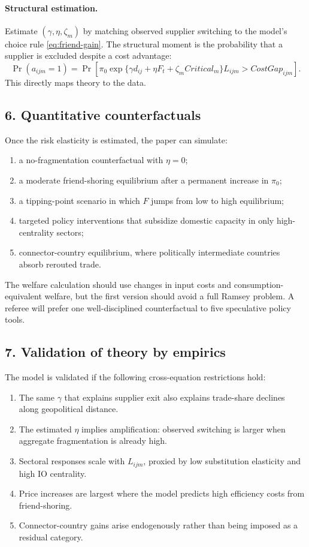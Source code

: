 \documentclass[11pt]{article}
\begin{document}
\paragraph{Structural estimation.} Estimate $(\gamma,\eta,\zeta_m)$ by matching observed supplier switching to the model's choice rule \eqref{eq:friend-gain}. The structural moment is the probability that a supplier is excluded despite a cost advantage:
\begin{equation}
\Pr(a_{ijm}=1)=\Pr\left[\pi_0\exp\{\gamma d_{ij}+\eta F_t+\zeta_m Critical_m\}L_{ijm}>CostGap_{ijm}\right].
\end{equation}
This directly maps theory to the data.

\subsection*{6. Quantitative counterfactuals}
Once the risk elasticity is estimated, the paper can simulate:
\begin{enumerate}[label=(\roman*)]
\item a no-fragmentation counterfactual with $\eta=0$;
\item a moderate friend-shoring equilibrium after a permanent increase in $\pi_0$;
\item a tipping-point scenario in which $F$ jumps from low to high equilibrium;
\item targeted policy interventions that subsidize domestic capacity in only high-centrality sectors;
\item connector-country equilibrium, where politically intermediate countries absorb rerouted trade.
\end{enumerate}
The welfare calculation should use changes in input costs and consumption-equivalent welfare, but the first version should avoid a full Ramsey problem. A referee will prefer one well-disciplined counterfactual to five speculative policy tools.

\subsection*{7. Validation of theory by empirics}
The model is validated if the following cross-equation restrictions hold:
\begin{enumerate}[label=\textbf{V\arabic*.},leftmargin=*]
\item The same $\gamma$ that explains supplier exit also explains trade-share declines along geopolitical distance.
\item The estimated $\eta$ implies amplification: observed switching is larger when aggregate fragmentation is already high.
\item Sectoral responses scale with $L_{ijm}$, proxied by low substitution elasticity and high IO centrality.
\item Price increases are largest where the model predicts high efficiency costs from friend-shoring.
\item Connector-country gains arise endogenously rather than being imposed as a residual category.
\end{enumerate}
\end{document}
